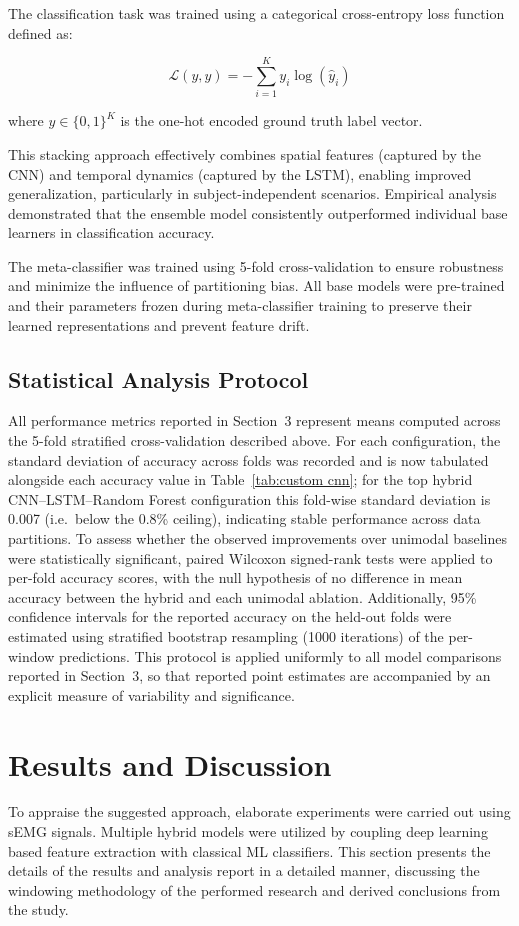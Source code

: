 \documentclass{elektr}
\newcommand{\yh}[1]{#1}
\begin{document}
The classification task was trained using a categorical cross-entropy loss function defined as:

\begin{equation}
	\mathcal{L}(y, \hat{y}) = -\sum_{i=1}^{K} y_i \log(\hat{y}_i)
\end{equation}

where $y \in \{0, 1\}^K$ is the one-hot encoded ground truth label vector.

This stacking approach effectively combines spatial features (captured by the CNN) and temporal dynamics (captured by the LSTM), enabling improved generalization, particularly in subject-independent scenarios. Empirical analysis demonstrated that the ensemble model consistently outperformed individual base learners in classification accuracy.

The meta-classifier was trained using 5-fold cross-validation to ensure robustness and minimize the influence of partitioning bias. All base models were pre-trained and their parameters frozen during meta-classifier training to preserve their learned representations and prevent feature drift.

\subsection{Statistical Analysis Protocol}
\yh{All performance metrics reported in Section~3 represent means computed across the 5-fold stratified cross-validation described above. For each configuration, the standard deviation of accuracy across folds was recorded and is now tabulated alongside each accuracy value in Table~\ref{tab:custom cnn}; for the top hybrid CNN--LSTM--Random Forest configuration this fold-wise standard deviation is 0.007 (i.e.\ below the 0.8\% ceiling), indicating stable performance across data partitions. To assess whether the observed improvements over unimodal baselines were statistically significant, paired Wilcoxon signed-rank tests were applied to per-fold accuracy scores, with the null hypothesis of no difference in mean accuracy between the hybrid and each unimodal ablation. Additionally, 95\% confidence intervals for the reported accuracy on the held-out folds were estimated using stratified bootstrap resampling (1000 iterations) of the per-window predictions. This protocol is applied uniformly to all model comparisons reported in Section~3, so that reported point estimates are accompanied by an explicit measure of variability and significance.}
\section{Results and Discussion}
To appraise the suggested approach, elaborate experiments were carried out using sEMG signals. Multiple hybrid models were utilized by coupling deep learning based feature extraction with classical ML classifiers. This section presents the details of the results and analysis report in a detailed manner, discussing the windowing methodology of the performed research and derived conclusions from the study.
\end{document}

